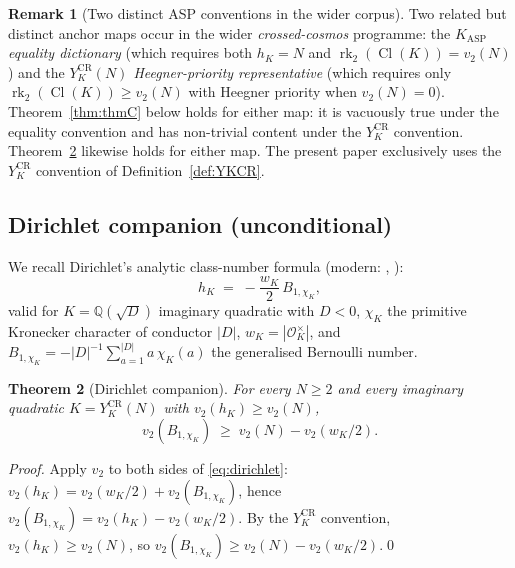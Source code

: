 \documentclass[11pt,a4paper,reqno]{amsart}
\newtheorem{theorem}{Theorem}[section]
\theoremstyle{definition}
\newtheorem{remark}[theorem]{Remark}
\DeclareMathOperator{\Cl}{Cl}
\DeclareMathOperator{\rk}{rk}
\newcommand{\OK}{\mathcal{O}_K}
\newcommand{\QQ}{\mathbb{Q}}
\newcommand{\vtwo}{v_2}
\newcommand{\YKCR}{Y_K^{\mathrm{CR}}}
\begin{document}
\begin{remark}[Two distinct ASP conventions in the wider corpus]\label{rem:asp-conventions}
Two related but distinct anchor maps occur in the wider \emph{crossed-cosmos}
programme: the \emph{$K_{\mathrm{ASP}}$ equality dictionary} (which requires
both $h_K=N$ and $\rk_2(\Cl(K))=v_2(N)$) and the \emph{$\YKCR(N)$
Heegner-priority representative} (which requires only
$\rk_2(\Cl(K))\ge v_2(N)$ with Heegner priority when $v_2(N)=0$).
Theorem~\ref{thm:thmC} below holds for either map: it is vacuously true under
the equality convention and has non-trivial content under the
$\YKCR$ convention.  Theorem~\ref{thm:thmCprime} likewise holds for either
map.  The present paper exclusively uses the $\YKCR$ convention of
Definition~\ref{def:YKCR}.
\end{remark}

\subsection{Dirichlet companion (unconditional)}\label{ss:CRprime}

We recall Dirichlet's analytic class-number formula \cite{Dirichlet1839}
(modern: \cite[\S4.9]{Davenport2000}, \cite[\S7.B]{Cox1989}):
\begin{equation}\label{eq:dirichlet}
   h_K \;=\; -\frac{w_K}{2}\,B_{1,\chi_K},
\end{equation}
valid for $K=\QQ(\sqrt{D})$ imaginary quadratic with $D<0$, $\chi_K$ the
primitive Kronecker character of conductor $|D|$, $w_K=|\OK^\times|$, and
$B_{1,\chi_K} = -|D|^{-1}\sum_{a=1}^{|D|} a\,\chi_K(a)$ the generalised
Bernoulli number.

\begin{theorem}[Dirichlet companion]\label{thm:thmCprime}
For every $N\ge 2$ and every imaginary quadratic $K=\YKCR(N)$ with
$\vtwo(h_K)\ge\vtwo(N)$,
\begin{equation}\label{eq:CRprime}
  \vtwo(B_{1,\chi_K}) \;\geq\; \vtwo(N) - \vtwo(w_K/2).
\end{equation}
\end{theorem}

\begin{proof}
Apply $\vtwo$ to both sides of \eqref{eq:dirichlet}:
$\vtwo(h_K) = \vtwo(w_K/2) + \vtwo(B_{1,\chi_K})$, hence
$\vtwo(B_{1,\chi_K}) = \vtwo(h_K) - \vtwo(w_K/2)$.  By the
$\YKCR$ convention, $\vtwo(h_K)\ge\vtwo(N)$, so
$\vtwo(B_{1,\chi_K})\ge\vtwo(N)-\vtwo(w_K/2)$.\qed
\end{proof}
\end{document}
